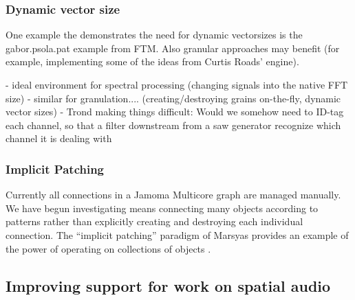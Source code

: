 \documentclass[twoside,a4paper]{article}
\begin{document}


\subsubsection{Dynamic vector size} %


One example the demonstrates the need for dynamic vectorsizes is the gabor.psola.pat example from FTM. 
Also granular approaches may benefit (for example, implementing some of the ideas from Curtis Roads' engine).

- ideal environment for spectral processing (changing signals into the native FFT size)
- similar for granulation.... (creating/destroying grains on-the-fly, dynamic vector sizes)
- Trond making things difficult: Would we somehow need to ID-tag each channel, so that a filter downstream from a saw generator recognize which channel it is dealing with




\subsubsection{Implicit Patching} %


Currently all connections in a Jamoma Multicore graph are managed manually.  
We have begun investigating means connecting many objects according to patterns rather than explicitly creating and destroying each individual connection.  
The ``implicit patching'' paradigm of Marsyas provides an example of the power of operating on collections of objects \cite{Bray:2005}.




\subsection{Improving support for work on spatial audio} %




\end{document}
